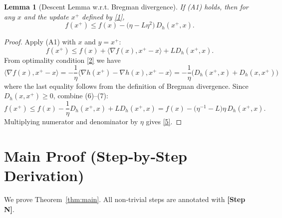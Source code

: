 \documentclass{article}
\newtheorem{lemma}{Lemma}
\newcommand{\D}[2]{D_{h}(#1,#2)}
\newcommand{\grad}{\nabla}
\newcommand{\inner}[2]{\langle #1,#2\rangle}
\begin{document}
\begin{lemma}[Descent Lemma w.r.t. Bregman divergence]\label{lem:descent}
If (A1) holds, then for any $x$ and the update $x^{+}$ defined by \eqref{1},
\[
f(x^{+})\le f(x)-\bigl(\eta-L\eta^{2}\bigr)\,\D{x^{+}}{x}.
\tag{5}
\]
\end{lemma}
\begin{proof}
Apply (A1) with $x$ and $y=x^{+}$:
\[
f(x^{+})\le f(x)+\inner{\grad f(x)}{x^{+}-x}+L\D{x^{+}}{x}. \tag{6}
\]
From optimality condition \eqref{2} we have
\[
\inner{\grad f(x)}{x^{+}-x}= -\frac{1}{\eta}\inner{\grad h(x^{+})-\grad h(x)}{x^{+}-x}
                     =-\frac{1}{\eta}\bigl(\D{x^{+}}{x}+\D{x}{x^{+}}\bigr) \tag{7}
\]
where the last equality follows from the definition of Bregman divergence.  
Since $\D{x}{x^{+}}\ge0$, combine (6)–(7):
\[
f(x^{+})\le f(x)-\frac{1}{\eta}\D{x^{+}}{x}+L\D{x^{+}}{x}
        = f(x)-\bigl(\eta^{-1}-L\bigr)\eta\,\D{x^{+}}{x}.
\]
Multiplying numerator and denominator by $\eta$ gives \eqref{5}. \qedhere
\end{proof}

\section*{Main Proof (Step‑by‑Step Derivation)}
We prove Theorem~\ref{thm:main}.  
All non‑trivial steps are annotated with \textbf{[Step N]}.
\end{document}
